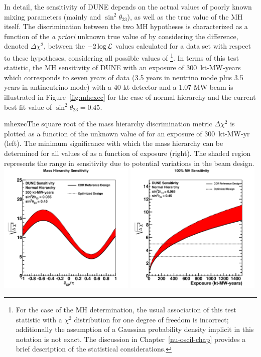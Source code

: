 In detail, the sensitivity of DUNE depends on the actual values of
poorly known mixing parameters (mainly \deltacp and
$\sin^2{\theta_{23}}$), as well as the true value of the MH itself.
The discrimination between the two MH hypotheses is characterized as a
function of the \emph{a priori} unknown true value of \deltacp by
considering the difference, denoted $\Delta \chi^2$, between the
$-2\log{\cal L}$ values calculated for a data set with respect to
these hypotheses, considering all possible values of
\deltacp\footnote{For the case of the MH determination, the usual
  association of this test statistic with a $\chi^2$ distribution for
  one degree of freedom is incorrect; additionally the assumption of a
  Gaussian probability density %
  implicit in this notation is not exact.  The discussion in
  Chapter~\ref{nu-oscil-chap} provides a brief description of the
  statistical considerations.}.  In terms of this test statistic, the
MH sensitivity of DUNE with an exposure of 300~kt-MW-years which
corresponds to seven years of data (3.5 years in neutrino mode plus
3.5 years in antineutrino mode) with a 40-kt detector and a 1.07-MW
beam is illustrated in Figure~\ref{fig:mhexec} for the case of normal
hierarchy and the current best fit value of $\sin^2 \theta_{23} = 0.45$.
%
\begin{cdrfigure}{mhexec}{The square root of
    the mass hierarchy discrimination metric $\Delta \chi^2$ is
    plotted as a function of the unknown value of \deltacp for an
    exposure of 300~kt-MW-yr (left).  The minimum significance with which the mass hierarchy can be determined for all values of \deltacp as a function of exposure (right).
    The shaded region represents the range in sensitivity due to
    potential variations in the beam design.}
\includegraphics[width=0.49\textwidth]{volume-physics/figures/mh_300ktmwyear}
\includegraphics[width=0.49\textwidth]{volume-physics/figures/mh_exp}
\label{fig:mhexec}
\end{cdrfigure}

